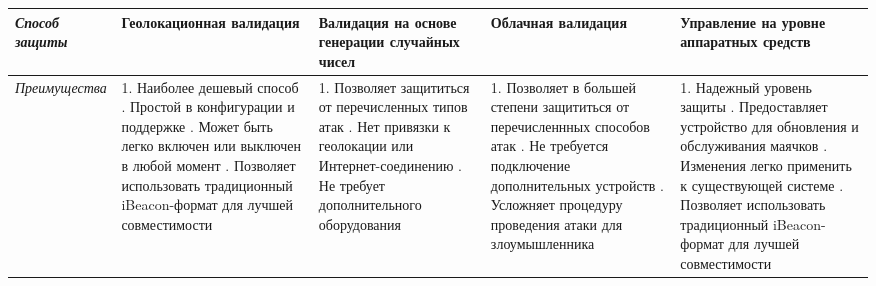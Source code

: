 \begin{sideways}
	\begin{tabu} to 
	\hline
	\textit{Способ защиты} & 
	    \textbf{Геолокационная валидация} & 
	    \textbf{Валидация на основе генерации случайных чисел} &
	    \textbf{Облачная валидация} &
	    \textbf{Управление на уровне аппаратных средств} \\
	\hline
	
	\textit{Преимущества} & 
	    1. Наиболее дешевый способ . Простой в конфигурации и поддержке . Может быть легко включен или выключен в любой момент . Позволяет использовать традиционный iBeacon-формат для лучшей совместимости & 
	    
	    1. Позволяет защититься от перечисленных типов атак . Нет привязки к геолокации или Интернет-соединению . Не требует дополнительного оборудования &
	    
	    1. Позволяет в большей степени защититься от перечисленнных способов атак . Не требуется подключение дополнительных устройств . Усложняет процедуру проведения атаки для злоумышленника &
	    
	    1. Надежный уровень защиты . Предоставляет устройство для обновления и обслуживания маячков . Изменения легко применить к существующей системе . Позволяет использовать традиционный iBeacon-формат для лучшей совместимости \\
	\hline
	\end{tabu}
\end{sideways}

